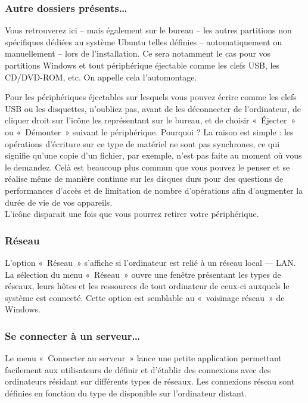 \subsubsection{Autre dossiers présents\ldots{}}
\label{AutrePartitions}
Vous retrouverez ici -- mais également sur le bureau -- les autres partitions non spécifiques dédiées au système Ubuntu telles définies -- automatiquement ou manuellement -- lors de l'installation. Ce sera notamment le cas pour vos partitions Windows et tout périphérique éjectable comme les clefs USB, les CD/DVD-ROM, etc. On appelle cela l'automontage.\par
Pour les périphériques éjectables sur lesquels vous pouvez écrire comme les clefs USB ou les disquettes, n'oubliez pas, avant de les déconnecter de l'ordinateur, de cliquer droit sur l'icône les représentant sur le bureau, et de choisir «~Éjecter~» ou «~Démonter~» suivant le périphérique. Pourquoi ? La raison est simple : les opérations d'écriture sur ce type de matériel ne sont pas synchrones, ce qui signifie qu'une copie d'un fichier, par exemple, n'est pas faite au moment où vous le demandez. Celà est beaucoup plus commun que vous pouvez le penser et se réalise même de manière continue sur les disques durs pour des questions de performances d'accès et de limitation de nombre d'opérations afin d'augmenter la durée de vie de vos appareils.\\
L'icône disparait une fois que vous pourrez retirer votre périphérique.
\subsubsection{Réseau}
L'option «~Réseau~» s'affiche si l'ordinateur est relié à un réseau local --- LAN. La sélection du menu «~Réseau~» ouvre une fenêtre présentant les types de réseaux, leurs hôtes et les ressources de tout ordinateur de ceux-ci auxquels le système est connecté. Cette option est semblable au «~voisinage réseau~» de Windows.
\subsubsection{Se connecter à un serveur\ldots{}}
Le menu «~Connecter au serveur~» lance une petite application permettant facilement aux utilisateurs de définir et d'établir des connexions avec des ordinateurs résidant sur différents types de réseaux. Les connexions réseau sont définies en fonction du type de  disponible sur l'ordinateur distant. 
